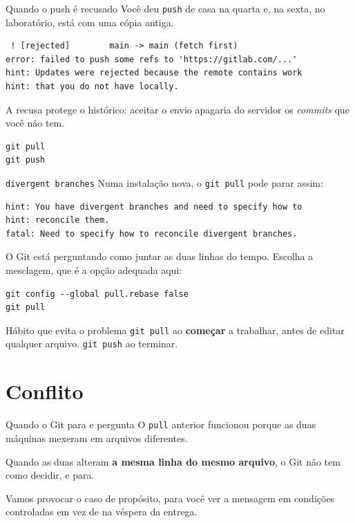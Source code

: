 \documentclass{beamer}
\begin{document}
\begin{frame}[fragile]{Quando o push é recusado}
  Você deu \texttt{push} de casa na quarta e, na sexta, no laboratório, está com
  uma cópia antiga.

  \begin{verbatim}
 ! [rejected]        main -> main (fetch first)
error: failed to push some refs to 'https://gitlab.com/...'
hint: Updates were rejected because the remote contains work
hint: that you do not have locally.
  \end{verbatim}

  A recusa protege o histórico: aceitar o envio apagaria do servidor os
  \textit{commits} que você não tem.

  \begin{verbatim}
git pull
git push
  \end{verbatim}
\end{frame}

\begin{frame}[fragile]{\texttt{divergent branches}}
  Numa instalação nova, o \texttt{git pull} pode parar assim:

  \begin{verbatim}
hint: You have divergent branches and need to specify how to
hint: reconcile them.
fatal: Need to specify how to reconcile divergent branches.
  \end{verbatim}

  O Git está perguntando como juntar as duas linhas do tempo. Escolha a
  mesclagem, que é a opção adequada aqui:

  \begin{verbatim}
git config --global pull.rebase false
git pull
  \end{verbatim}

  \vspace{0.2cm}
  \begin{block}{Hábito que evita o problema}
    \texttt{git pull} ao \textbf{começar} a trabalhar, antes de editar qualquer
    arquivo. \texttt{git push} ao terminar.
  \end{block}
\end{frame}

\section{Conflito}

\begin{frame}{Quando o Git para e pergunta}
  O \texttt{pull} anterior funcionou porque as duas máquinas mexeram em arquivos
  diferentes.

  \vspace{0.5cm}
  \begin{block}{}
    Quando as duas alteram \textbf{a mesma linha do mesmo arquivo}, o Git não
    tem como decidir, e para.
  \end{block}

  \vspace{0.5cm}
  Vamos provocar o caso de propósito, para você ver a mensagem em condições
  controladas em vez de na véspera da entrega.
\end{frame}
\end{document}
